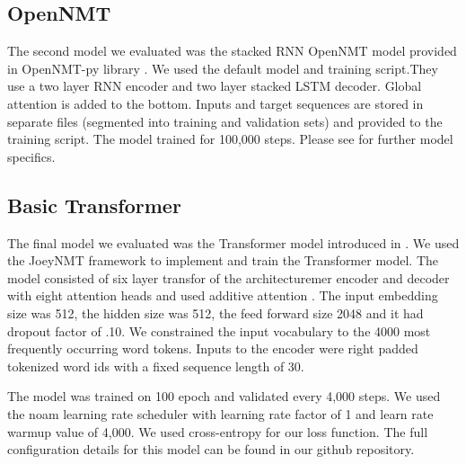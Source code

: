\documentclass[letterpaper]{article} %
\begin{document}
\subsection{OpenNMT}
The second model we evaluated was the stacked RNN OpenNMT model provided in OpenNMT-py library \cite{klein-etal-2018-opennmt}. We used the default model and training script.They use a two layer RNN encoder and two layer stacked LSTM decoder. Global attention is added to the bottom. Inputs and target sequences are stored in separate files (segmented into training and validation sets) and provided to the training script. The model trained for 100,000 steps. Please see \citeauthor{klein-etal-2018-opennmt} for further model specifics. 

\subsection{Basic Transformer}
The final model we evaluated was the Transformer model introduced in \citeauthor{NIPS2017_7181} \citeyear{NIPS2017_7181}. We used the JoeyNMT framework to implement and train the Transformer model. The model consisted of six layer transfor of the architecturemer encoder and decoder with eight attention heads and used additive attention \cite{bahdanau2014neural}. The input embedding size was 512, the hidden size was 512, the feed forward size 2048 and it had dropout factor of .10. We constrained the input vocabulary to the 4000 most frequently occurring word tokens. Inputs to the encoder were right padded tokenized word ids with a fixed sequence length of 30. 

The model was trained on 100 epoch and validated every 4,000 steps. We used the noam learning rate scheduler \cite{DBLP:journals/corr/abs-1804-04235} with learning rate factor of 1 and learn rate warmup value of 4,000. We used cross-entropy for our loss function. The full configuration details for this model can be found in our github repository.
\end{document}
